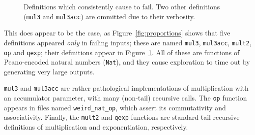 \begin{figure}
  \iffalse
  \begin{verbatim}
    (define-fun-rec mul3 ((x Nat) (y Nat) (z Nat)) Nat
      (match x
        (case Z Z)                          ;; Base case for 0 * y * z
        (case (S x2)
          (match y
            (case Z Z)                      ;; Base case for x * 0 * z
            (case (S x3)
              (match z
                (case Z Z)                  ;; Base case for x * y * 0
                (case (S x4)
                  (match x2
                    (case Z
                      (match x3
                        (case Z
                          (match x4
                            (case Z (S Z))  ;; Base case for 1 * 1 * 1
                            (case (S x5)
                              (S (add3 (mul3 Z Z x4)
                                       (add3 (mul3 (S Z) Z x4)
                                             (mul3 Z (S Z) x4)
                                             (mul3 Z Z (S Z)))
                                       (add3 Z Z x4))))))
                        (case (S x6)
                          (S (add3 (mul3 Z x3 x4)
                                   (add3 (mul3 (S Z) x3 x4)
                                         (mul3 Z (S Z) x4)
                                         (mul3 Z x3 (S Z)))
                                   (add3 Z x3 x4))))))
                    (case (S x7)
                      (S (add3 (mul3 x2 x3 x4)
                               (add3 (mul3 (S Z) x3 x4)
                                     (mul3 x2 (S Z) x4)
                                     (mul3 x2 x3 (S Z)))
                               (add3 x2 x3 x4))))))))))))
  \end{verbatim}
  \fi
  \caption{Definitions which consistently cause \qspec{} to fail. Two other
    definitions (\texttt{mul3} and \texttt{mul3acc}) are ommitted due to their
    verbosity.}
  \label{fig:faildefs}
\end{figure}

This does appear to be the case, as Figure~\ref{fig:proportions} shows that five
definitions appeared \emph{only} in failing inputs; these are named
\texttt{mul3}, \texttt{mul3acc}, \texttt{mult2}, \texttt{op} and \texttt{qexp};
their definitions appear in Figure~\ref{fig:faildefs}. All of these are
functions of Peano-encoded natural numbers (\texttt{Nat}), and they cause
exploration to time out by generating very large outputs.

\texttt{mul3} and \texttt{mul3acc} are rather pathological implementations of
multiplication with an accumulator parameter, with many (non-tail) recursive
calls. The \texttt{op} function appears in files named \texttt{weird\_nat\_op},
which assert its commutativity and associativity. Finally, the \texttt{mult2}
and \texttt{qexp} functions are standard tail-recursive definitions of
multiplication and exponentiation, respectively.


